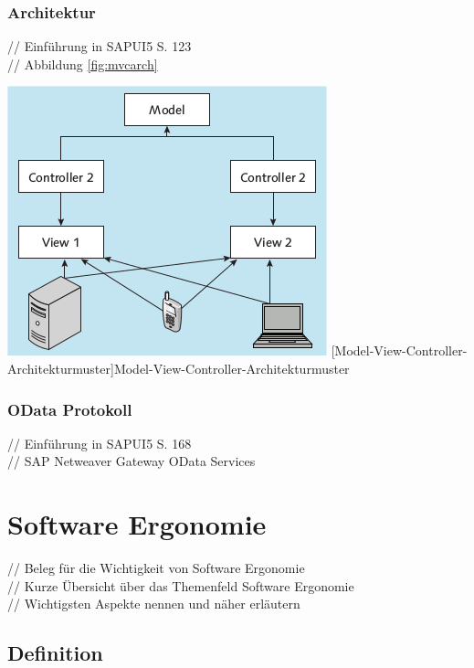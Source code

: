 \documentclass[12pt,a4paper,bibliography=totocnumbered,listof=totocnumbered]{scrartcl}
\begin{document}
\subsubsection{Architektur}
// Einführung in SAPUI5 S. 123 \cite{AntoEinf2014}\\
// Abbildung \ref{fig:mvcarch}\\
	\vspace{1em}
	\begin{minipage}{\linewidth}
		\centering
		\includegraphics[width=0.6\linewidth]{images/mvc_arch.png}
		[Model-View-Controller-Architekturmuster]{Model-View-Controller-Architekturmuster\cite{AntoEinf2014}}
		\label{fig:mvcarch}
	\end{minipage}

\subsubsection{OData Protokoll}
// Einführung in SAPUI5 S. 168 \\
// SAP Netweaver Gateway OData Services\\
\pagebreak

\section{Software Ergonomie}
// Beleg für die Wichtigkeit von Software Ergonomie\\
// Kurze Übersicht über das Themenfeld Software Ergonomie\\
// Wichtigsten Aspekte nennen und näher erläutern\\

\subsection{Definition}
\end{document}
